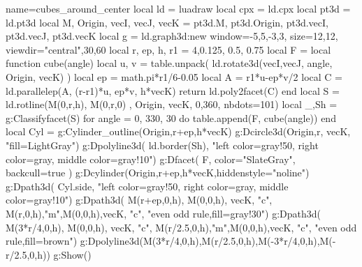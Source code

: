 \documentclass[border=5pt]{standalone}%
\begin{document}
\begin{luadraw}{name=cubes_around_center}
local ld = luadraw
local cpx = ld.cpx
local pt3d = ld.pt3d
local M, Origin, vecI, vecJ, vecK = pt3d.M, pt3d.Origin, pt3d.vecI, pt3d.vecJ, pt3d.vecK
local g = ld.graph3d:new{ window={-5,5,-3,3}, size={12,12}, viewdir={"central",30,60} }
local r, ep, h, r1 = 4,0.125, 0.5, 0.75
local F = {}
local function cube(angle)
    local u, v = table.unpack( ld.rotate3d({vecI,vecJ}, angle, {Origin, vecK}) )
    local ep = math.pi*r1/6-0.05
    local A = r1*u-ep*v/2
    local C = ld.parallelep(A, (r-r1)*u, ep*v, h*vecK)
    return ld.poly2facet(C)
end
local S = ld.rotline({M(0,r,h), M(0,r,0)} , {Origin, vecK}, 0,360, {nbdots=101})
local _,Sh = g:Classifyfacet(S)
for angle = 0, 330, 30 do
    table.append(F, cube(angle))
end
local Cyl = g:Cylinder_outline(Origin,r+ep,h*vecK)
g:Dcircle3d(Origin,r, vecK, "fill=LightGray")
g:Dpolyline3d( ld.border(Sh), "left color=gray!50, right color=gray, middle color=gray!10")
g:Dfacet( F, {color="SlateGray", backcull=true} )
g:Dcylinder(Origin,r+ep,h*vecK,{hiddenstyle="noline"})
g:Dpath3d( Cyl.side, "left color=gray!50, right color=gray, middle color=gray!10")
g:Dpath3d( {M(r+ep,0,h), M(0,0,h), vecK, "c", M(r,0,h),"m",M(0,0,h),vecK, "c"}, "even odd rule,fill=gray!30")
g:Dpath3d( {M(3*r/4,0,h), M(0,0,h), vecK, "c", M(r/2.5,0,h),"m",M(0,0,h),vecK, "c"}, "even odd rule,fill=brown")
g:Dpolyline3d({{M(3*r/4,0,h),M(r/2.5,0,h)},{M(-3*r/4,0,h),M(-r/2.5,0,h)}})
g:Show()
\end{luadraw}
\end{document}
